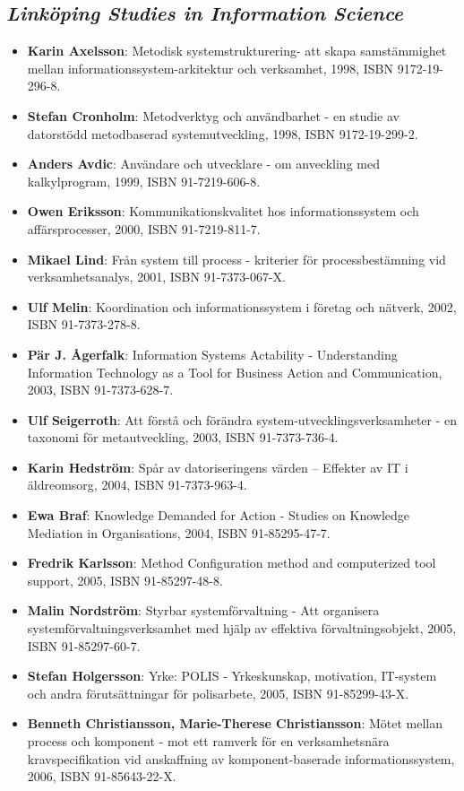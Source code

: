 \documentclass[a4paper,showtrims,twocolumn]{memoir}
\newcommand{\subseries}[1]{\subsection*{\footnotesize\normalfont\textit{#1}}}
\newenvironment{theses}
  {
    \begin{itemize}
      \setlength{\itemsep}{0.2em}
      \setlength{\parskip}{0em}
      \setlength{\parsep}{0em}
  }
  {
    \end{itemize}
  }
\newcommand{\thesis}[5]{\item[No. #1] \textbf{#2}: #3, #4, ISBN #5.}
\begin{document}
  \subseries{Linköping Studies in Information Science}

  \begin{theses}
    \thesis{1}{Karin Axelsson}{Metodisk systemstrukturering- att skapa samstämmighet mellan informationssystem-arkitektur och verksamhet}{1998}{9172-19-296-8}
    \thesis{2}{Stefan Cronholm}{Metodverktyg och användbarhet - en studie av datorstödd metodbaserad systemutveckling}{1998}{9172-19-299-2}
    \thesis{3}{Anders Avdic}{Användare och utvecklare - om anveckling med kalkylprogram}{1999}{91-7219-606-8}
    \thesis{4}{Owen Eriksson}{Kommunikationskvalitet hos informationssystem och affärsprocesser}{2000}{91-7219-811-7}
    \thesis{5}{Mikael Lind}{Från system till process - kriterier för processbestämning vid verksamhetsanalys}{2001}{91-7373-067-X}
    \thesis{6}{Ulf Melin}{Koordination och informationssystem i företag och nätverk}{2002}{91-7373-278-8}
    \thesis{7}{Pär J. Ågerfalk}{Information Systems Actability - Understanding Information Technology as a Tool for Business Action and Communication}{2003}{91-7373-628-7}
    \thesis{8}{Ulf Seigerroth}{Att förstå och förändra system-utvecklingsverksamheter - en taxonomi för metautveckling}{2003}{91-7373-736-4}
    \thesis{9}{Karin Hedström}{Spår av datoriseringens värden – Effekter av IT i äldreomsorg}{2004}{91-7373-963-4}
    \thesis{10}{Ewa Braf}{Knowledge Demanded for Action - Studies on Knowledge Mediation in Organisations}{2004}{91-85295-47-7}
    \thesis{11}{Fredrik Karlsson}{Method Configuration method and computerized tool support}{2005}{91-85297-48-8}
    \thesis{12}{Malin Nordström}{Styrbar systemförvaltning - Att organisera systemförvaltningsverksamhet med hjälp av effektiva förvaltningsobjekt}{2005}{91-85297-60-7}
    \thesis{13}{Stefan Holgersson}{Yrke: POLIS - Yrkeskunskap, motivation, IT-system och andra förutsättningar för polisarbete}{2005}{91-85299-43-X}
    \thesis{14}{Benneth Christiansson, Marie-Therese Christiansson}{Mötet mellan process och komponent - mot ett ramverk för en verksamhetsnära kravspecifikation vid anskaffning av komponent-baserade informationssystem}{2006}{91-85643-22-X}
  \end{theses}
\end{document}
